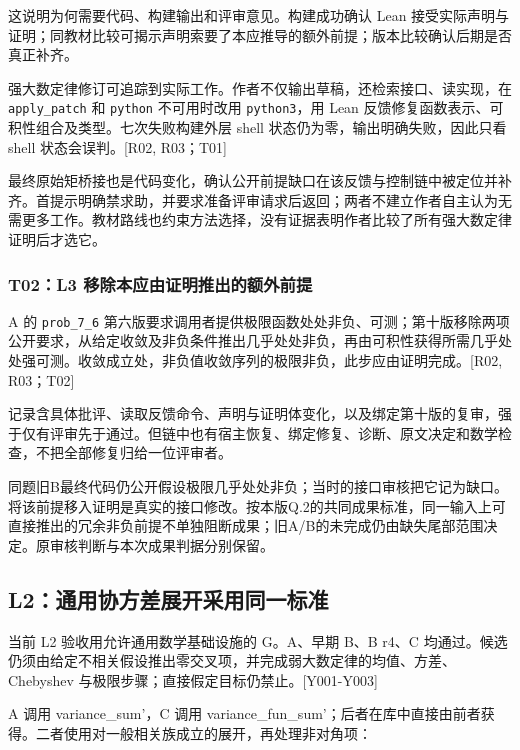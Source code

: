 这说明为何需要代码、构建输出和评审意见。构建成功确认 Lean 接受实际声明与证明；同教材比较可揭示声明索要了本应推导的额外前提；版本比较确认后期是否真正补齐。

强大数定律修订可追踪到实际工作。作者不仅输出草稿，还检索接口、读实现，在 \nolinkurl{apply_patch} 和 \nolinkurl{python} 不可用时改用 \nolinkurl{python3}，用 Lean 反馈修复函数表示、可积性组合及类型。七次失败构建外层 shell 状态仍为零，输出明确失败，因此只看 shell 状态会误判。[R02, R03；T01]

最终原始矩桥接也是代码变化，确认公开前提缺口在该反馈与控制链中被定位并补齐。首提示明确禁求助，并要求准备评审请求后返回；两者不建立作者自主认为无需更多工作。教材路线也约束方法选择，没有证据表明作者比较了所有强大数定律证明后才选它。

\subsubsection[T02：L3 移除本应由证明推出的额外前提]{\texorpdfstring{\protect\hypertarget{g14-2}{}T02：L3 移除本应由证明推出的额外前提}{T02：L3 移除本应由证明推出的额外前提}}
A 的 \nolinkurl{prob_7_6} 第六版要求调用者提供极限函数处处非负、可测；第十版移除两项公开要求，从给定收敛及非负条件推出几乎处处非负，再由可积性获得所需几乎处处强可测。收敛成立处，非负值收敛序列的极限非负，此步应由证明完成。[R02, R03；T02]

记录含具体批评、读取反馈命令、声明与证明体变化，以及绑定第十版的复审，强于仅有评审先于通过。但链中也有宿主恢复、绑定修复、诊断、原文决定和数学检查，不把全部修复归给一位评审者。

同题旧B最终代码仍公开假设极限几乎处处非负；当时的接口审核把它记为缺口。将该前提移入证明是真实的接口修改。按本版Q.2的共同成果标准，同一输入上可直接推出的冗余非负前提不单独阻断成果；旧A/B的未完成仍由缺失尾部范围决定。原审核判断与本次成果判据分别保留。

\subsection[L2：通用协方差展开采用同一标准]{\texorpdfstring{\protect\hypertarget{g15}{}L2：通用协方差展开采用同一标准}{L2：通用协方差展开采用同一标准}}
当前 L2 验收用允许通用数学基础设施的 G。A、早期 B、B r4、C 均通过。候选仍须由给定不相关假设推出零交叉项，并完成弱大数定律的均值、方差、Chebyshev 与极限步骤；直接假定目标仍禁止。[Y001-Y003]

A 调用 variance\_sum'，C 调用 variance\_fun\_sum'；后者在库中直接由前者获得。二者使用对一般相关族成立的展开，再处理非对角项：

